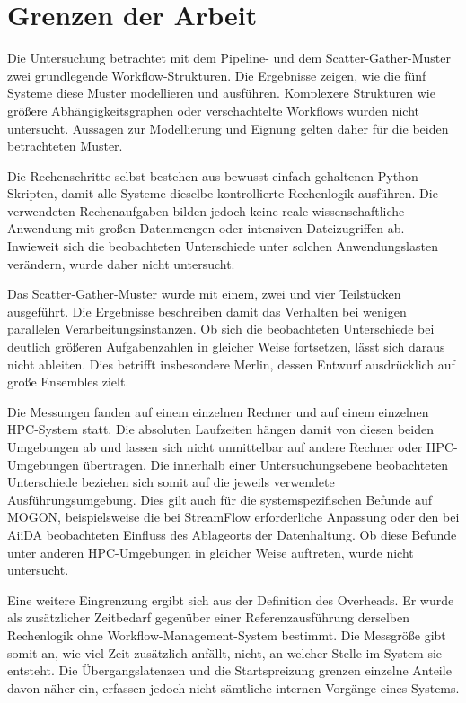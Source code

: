 \section{Grenzen der Arbeit}
\label{sec:diskussion:grenzen}

Die Untersuchung betrachtet mit dem Pipeline- und dem
Scatter-Gather-Muster zwei grundlegende Workflow-Strukturen. Die
Ergebnisse zeigen, wie die fünf Systeme diese Muster modellieren
und ausführen. Komplexere Strukturen wie größere
Abhängigkeitsgraphen oder verschachtelte Workflows wurden nicht untersucht. Aussagen zur Modellierung und Eignung gelten daher für die beiden betrachteten
Muster.

Die Rechenschritte selbst bestehen aus bewusst einfach gehaltenen
Python-Skripten, damit alle Systeme dieselbe kontrollierte
Rechenlogik ausführen. Die verwendeten Rechenaufgaben bilden jedoch
keine reale wissenschaftliche Anwendung mit großen Datenmengen oder
intensiven Dateizugriffen ab. Inwieweit sich die beobachteten
Unterschiede unter solchen Anwendungslasten verändern, wurde daher
nicht untersucht.

Das Scatter-Gather-Muster wurde mit einem, zwei und vier
Teilstücken ausgeführt. Die Ergebnisse beschreiben damit das
Verhalten bei wenigen parallelen Verarbeitungsinstanzen. Ob sich
die beobachteten Unterschiede bei deutlich größeren Aufgabenzahlen
in gleicher Weise fortsetzen, lässt sich daraus nicht ableiten.
Dies betrifft insbesondere Merlin, dessen Entwurf ausdrücklich auf
große Ensembles zielt.

Die Messungen fanden auf einem einzelnen Rechner und auf einem
einzelnen HPC-System statt. Die absoluten Laufzeiten hängen damit
von diesen beiden Umgebungen ab und lassen sich nicht unmittelbar auf andere
Rechner oder HPC-Umgebungen übertragen.
Die innerhalb einer Untersuchungsebene beobachteten Unterschiede 
beziehen sich somit auf die jeweils verwendete Ausführungsumgebung.
Dies gilt auch für die systemspezifischen Befunde auf MOGON, 
beispielsweise die bei StreamFlow erforderliche Anpassung oder den bei AiiDA beobachteten Einfluss des Ablageorts der Datenhaltung. Ob diese Befunde unter
anderen HPC-Umgebungen in gleicher Weise auftreten, wurde nicht
untersucht.

Eine weitere Eingrenzung ergibt sich aus der Definition des
Overheads. Er wurde als zusätzlicher Zeitbedarf gegenüber einer
Referenzausführung derselben Rechenlogik ohne
Workflow-Management-System bestimmt. Die Messgröße gibt somit an,
wie viel Zeit zusätzlich anfällt, nicht, an welcher Stelle im
System sie entsteht. Die Übergangslatenzen und die Startspreizung
grenzen einzelne Anteile davon näher ein, erfassen jedoch nicht sämtliche internen Vorgänge eines Systems.

